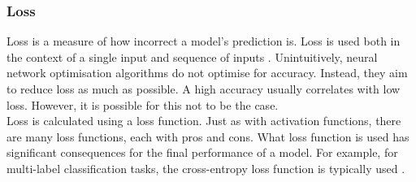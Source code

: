 \subsubsection{Loss}
\label{loss}


\noindent
Loss is a measure of how incorrect a model's prediction is. Loss is used both in the context of a single input and sequence of inputs \cite[p.~11]{python-machine-learning}. Unintuitively, neural network optimisation algorithms do not optimise for accuracy. Instead, they aim to reduce loss as much as possible. A high accuracy usually correlates with low loss. However, it is possible for this not to be the case. \\ 


\noindent
Loss is calculated using a loss function. Just as with activation functions, there are many loss functions, each with pros and cons. What loss function is used has significant consequences for the final performance of a model. For example, for multi-label classification tasks, the cross-entropy loss function is typically used \cite[p.~17]{AggarwalCharuC2018Nnad}.\\


